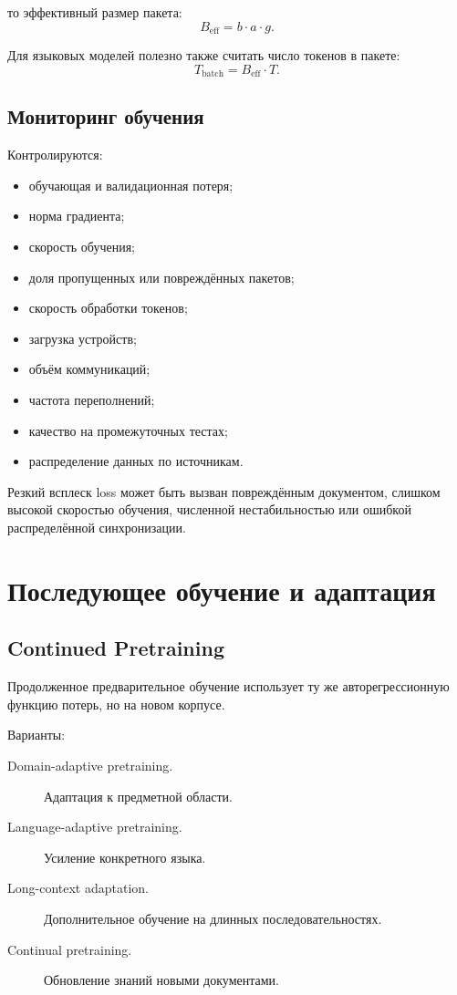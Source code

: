 \documentclass[12pt,a4paper]{article}
\newcommand{\1}{\mathbf{1}}
\theoremstyle{definition}
\theoremstyle{remark}
\begin{document}
то эффективный размер пакета:
\[
B_{\mathrm{eff}}=b\cdot a\cdot g.
\]

Для языковых моделей полезно также считать число токенов в пакете:
\[
T_{\mathrm{batch}}
=
B_{\mathrm{eff}}\cdot T.
\]

\subsection{Мониторинг обучения}

Контролируются:

\begin{itemize}
    \item обучающая и валидационная потеря;
    \item норма градиента;
    \item скорость обучения;
    \item доля пропущенных или повреждённых пакетов;
    \item скорость обработки токенов;
    \item загрузка устройств;
    \item объём коммуникаций;
    \item частота переполнений;
    \item качество на промежуточных тестах;
    \item распределение данных по источникам.
\end{itemize}

Резкий всплеск loss может быть вызван повреждённым документом,
слишком высокой скоростью обучения, численной нестабильностью или
ошибкой распределённой синхронизации.

\section{Последующее обучение и адаптация}

\subsection{Continued Pretraining}

Продолженное предварительное обучение использует ту же
авторегрессионную функцию потерь, но на новом корпусе.

Варианты:

\begin{description}
    \item[Domain-adaptive pretraining.] Адаптация к предметной области.
    \item[Language-adaptive pretraining.] Усиление конкретного языка.
    \item[Long-context adaptation.] Дополнительное обучение на длинных
    последовательностях.
    \item[Continual pretraining.] Обновление знаний новыми документами.
\end{description}
\end{document}
